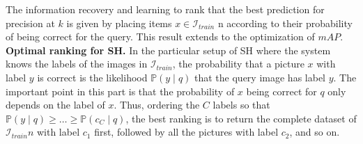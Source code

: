 \documentclass[conference]{IEEEtran}
\begin{document}

The information recovery \cite{doi:10.1108/eb026647} and learning to rank that the best prediction for precision at $k$ is given by placing items $x \in \mathcal{I}_{train}$ n according to their probability of being correct for the query. This result extends to the optimization of $mAP$.
\\
\textbf{Optimal ranking for SH.} In the particular setup of SH where the system knows the labels of the images in $\mathcal{I}_{train}$, the probability that a picture $x$ with label $y$ is correct is the likelihood $\mathbb{P}(y\mid q)$ that the query image has label $y$. The important point in this part is that the probability of $x$ being correct for $q$ only depends on the label of $x$. Thus, ordering the $C$ labels so that $\mathbb{P}(y\mid q)\geq \dots \geq\mathbb{P}(c_C\mid q)$, the best ranking is to return the complete dataset of $\mathcal{I}_{train}n$ with label $c_1$ first, followed by all the pictures with label $c_2$, and so on.
\\

\end{document}
